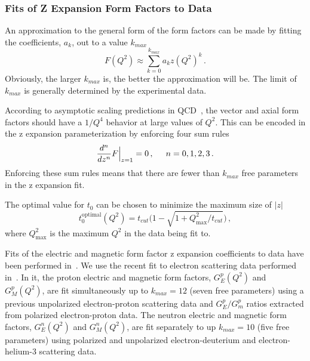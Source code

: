   \subsubsection{Fits of Z Expansion Form Factors to Data}

  An approximation to the general form of the form factors can be made by
  fitting the coefficients, $a_k$, out to a value $k_{max}$
  \begin{equation}
    F(Q^2) \approx \sum_{k=0}^{k_{max}} a_{k}z(Q^2)^k \,.
  \end{equation}
  Obviously, the larger $k_{max}$ is, the better the approximation will be. The
  limit of $k_{max}$ is generally determined by the experimental data.

  According to asymptotic scaling predictions in QCD~\cite{Lepage:1980fj}, the
  vector and axial form factors should have a $1/Q^4$ behavior at large values
  of $Q^2$. This can be encoded in the z expansion parameterization by
  enforcing four sum rules~\cite{Lee:2015jqa}
  \begin{align}\label{eq:zsumrules}
    \frac{d^n}{dz^n} F\Big\rvert_{z=1} = 0\,, \hspace{5mm} n=0,1,2,3 \,.
  \end{align}
  Enforcing these sum rules means that there are fewer than $k_{max}$ free
  parameters in the z expansion fit.

  The optimal value for $t_0$ can be chosen to minimize the maximum size of
  $|z|$~\cite{Meyer:2016oeg}
  \begin{equation}\label{eq:topt}
    t_0^{\textrm{optimal}}(Q^2) = t_{cut}\Big(1 - \sqrt{1+Q^2_{\textrm{max}}/t_{cut}}\Big) \,,
  \end{equation}
  where $Q^2_{\textrm{max}}$ is the maximum $Q^2$ in the data being fit to.

  Fits of the electric and magnetic form factor z expansion coefficients to
  data have been performed
  in~\cite{Hill:2010yb,Epstein:2014zua,Lee:2015jqa,Ye:2017gyb}.  We use the
  recent fit to electron scattering data performed in~\cite{Ye:2017gyb}. In it,
  the proton electric and magnetic form factors, $G_E^p(Q^2)$ and $G_M^p(Q^2)$,
  are fit simultaneously up to $k_{max} = 12$ (seven free parameters) using a
  previous unpolarized electron-proton scattering data and $G_E^p/G_m^p$ ratios
  extracted from polarized electron-proton data. The neutron electric and
  magnetic form factors, $G_E^n(Q^2)$ and $G_M^n(Q^2)$, are fit separately to
  up $k_{max} = 10$ (five free parameters) using polarized and unpolarized
  electron-deuterium and electron-helium-3 scattering data.

